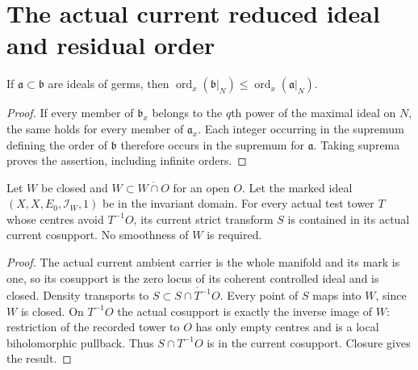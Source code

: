\section{The actual current reduced ideal and residual order}

\begin{lemma}
\label{hir:order-antitone-ideal}
\leanok
If $\mathfrak a\subset\mathfrak b$ are ideals of germs, then
$\operatorname{ord}_x(\mathfrak b|_N)\leq\operatorname{ord}_x(\mathfrak a|_N)$.
\end{lemma}
\begin{proof}
If every member of $\mathfrak b_x$ belongs to the $q$th power of the
maximal ideal on $N$, the same holds for every member of $\mathfrak a_x$.
Each integer occurring in the supremum defining the order of $\mathfrak b$
therefore occurs in the supremum for $\mathfrak a$. Taking suprema proves
the assertion, including infinite orders.
\end{proof}

\begin{lemma}
\label{hir:current-strict-transform-in-cosupport}
\leanok
Let $W$ be closed and $W\subset\overline{W\cap O}$ for an open $O$.
Let the marked ideal $(X,X,E_0,\mathcal I_W,1)$ be in the invariant domain.
For every actual test tower $T$ whose centres avoid $T^{-1}O$, its current
strict transform $S$ is contained in its actual current cosupport.
No smoothness of $W$ is required.
\end{lemma}
\begin{proof}
The actual current ambient carrier is the whole manifold and its mark is one,
so its cosupport is the zero locus of its coherent controlled ideal and is
closed. Density transports to $S\subset\overline{S\cap T^{-1}O}$.
Every point of $S$ maps into $W$, since $W$ is closed. On $T^{-1}O$ the
actual cosupport is exactly the inverse image of $W$: restriction of the
recorded tower to $O$ has only empty centres and is a local biholomorphic
pullback. Thus $S\cap T^{-1}O$ is in the current cosupport. Closure gives
the result.
\end{proof}

